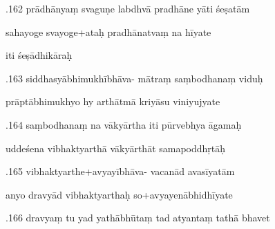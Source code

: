 \documentclass[article,12pt,a4paper]{memoir}%
\newcounter{parCount}
\begin{document}
	  
	  \pstart {}.162 prādhānyaṃ svaguṇe labdhvā pradhāne yāti śeṣatām 
	{}
	\pend%
      

	  
	  \pstart \leavevmode%
	sahayoge svayoge+ataḥ pradhānatvaṃ na hīyate 
	{}
	\pend%
      

	  
	  \pstart \leavevmode%
	iti śeṣādhikāraḥ
	{}
	\pend%
      
	  
	

	  
	  \pstart {}.163  siddhasyābhimukhībhāva- mātraṃ saṃbodhanaṃ viduḥ 
	{}
	\pend%
      

	  
	  \pstart \leavevmode%
	prāptābhimukhyo hy arthātmā kriyāsu viniyujyate 
	{}
	\pend%
      

	  
	  \pstart {}.164 saṃbodhanaṃ na vākyārtha iti pūrvebhya āgamaḥ 
	{}
	\pend%
      

	  
	  \pstart \leavevmode%
	uddeśena vibhaktyarthā vākyārthāt samapoddhṛtāḥ 
	{}
	\pend%
      

	  
	  \pstart {}.165 vibhaktyarthe+avyayībhāva- vacanād avasīyatām 
	{}
	\pend%
      

	  
	  \pstart \leavevmode%
	anyo dravyād vibhaktyarthaḥ so+avyayenābhidhīyate 
	{}
	\pend%
      

	  
	  \pstart {}.166 dravyaṃ tu yad yathābhūtaṃ tad atyantaṃ tathā bhavet 
	{}
	\pend%
      
\end{document}
